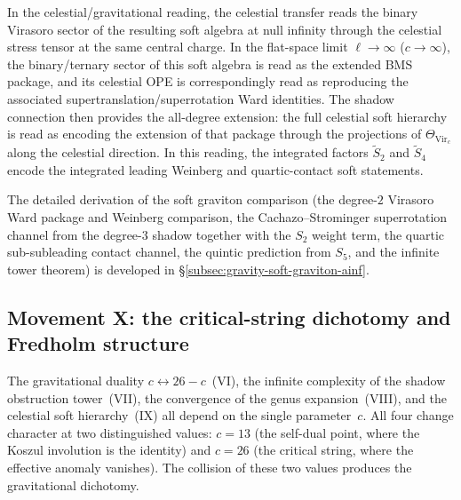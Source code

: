 In the celestial/gravitational reading, the celestial transfer reads
the binary Virasoro sector of the resulting soft algebra at null infinity
through the celestial stress tensor at the same central charge. In
the flat-space limit
$\ell \to \infty$ ($c \to \infty$), the binary/ternary sector of this
soft algebra is read as the extended BMS package, and its celestial
OPE is correspondingly read as reproducing the associated
supertranslation/superrotation Ward identities. The shadow connection then
provides the all-degree extension: the full celestial soft hierarchy is
read as encoding the extension of that package through the projections of
$\Theta_{\mathrm{Vir}_c}$ along the celestial direction. In this
reading, the integrated factors $\widetilde{S}_2$ and
$\widetilde{S}_4$ encode the integrated leading Weinberg and
quartic-contact soft statements.


The detailed derivation of the soft graviton comparison
(the degree-$2$ Virasoro Ward package and Weinberg comparison,
the Cachazo--Strominger superrotation channel from the degree-$3$
shadow together with the $S_2$ weight term, the quartic
sub-subleading contact channel, the quintic prediction from $S_5$,
and the infinite tower theorem) is developed in
\S\ref{subsec:gravity-soft-graviton-ainf}.


\subsection{Movement X: the critical-string dichotomy and Fredholm
structure}
\label{subsec:gravity-critical-string-fredholm}

The gravitational duality $c \leftrightarrow 26-c$~(VI), the
infinite complexity of the shadow obstruction tower~(VII), the
convergence of the genus expansion~(VIII), and the celestial soft
hierarchy~(IX) all depend on the single parameter~$c$. All four
change character at two distinguished values: $c = 13$ (the
self-dual point, where the Koszul involution is the identity) and
$c = 26$ (the critical string, where the effective anomaly
vanishes). The collision of these two values produces the
gravitational dichotomy.

